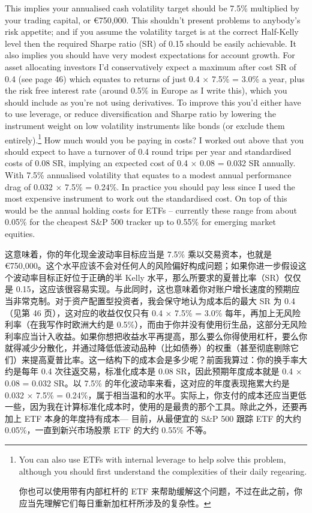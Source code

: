 \bipairgap

\begin{englishblock} This implies your annualised cash volatility target should be 7.5\% multiplied by your trading capital, or €750,000. This shouldn't present problems to anybody's risk appetite; and if you assume the volatility target is at the correct Half-Kelly level then the required Sharpe ratio (SR) of 0.15 should be easily achievable. It also implies you should have very modest expectations for account growth. For asset allocating investors I'd conservatively expect a maximum after cost SR of 0.4 (see page 46) which equates to returns of just 0.4 × 7.5\% = 3.0\% a year, plus the risk free interest rate (around 0.5\% in Europe as I write this), which you should include as you're not using derivatives. To improve this you'd either have to use leverage, or reduce diversification and Sharpe ratio by lowering the instrument weight on low volatility instruments like bonds (or exclude them entirely).\footnote{You can also use ETFs with internal leverage to help solve this problem, although you should first understand the complexities of their daily regearing. \par 你也可以使用带有内部杠杆的 ETF 来帮助缓解这个问题，不过在此之前，你应当先理解它们每日重新加杠杆所涉及的复杂性。} How much would you be paying in costs? I worked out above that you should expect to have a turnover of 0.4 round trips per year and standardised costs of 0.08 SR, implying an expected cost of 0.4 × 0.08 = 0.032 SR annually. With 7.5\% annualised volatility that equates to a modest annual performance drag of 0.032 × 7.5\% = 0.24\%. In practice you should pay less since I used the most expensive instrument to work out the standardised cost. On top of this would be the annual holding costs for ETFs -- currently these range from about 0.05\% for the cheapest S\&P 500 tracker up to 0.55\% for emerging market equities. \end{englishblock}

\begin{chineseblock}这意味着，你的年化现金波动率目标应当是 7.5\% 乘以交易资本，也就是 €750,000。这个水平应该不会对任何人的风险偏好构成问题；如果你进一步假设这个波动率目标正好位于正确的半 Kelly 水平，那么所要求的夏普比率（SR）仅仅是 0.15，这应该很容易实现。与此同时，这也意味着你对账户增长速度的预期应当非常克制。对于资产配置型投资者，我会保守地认为成本后的最大 SR 为 0.4（见第 46 页），这对应的收益仅仅只有 0.4 × 7.5\% = 3.0\% 每年，再加上无风险利率（在我写作时欧洲大约是 0.5\%），而由于你并没有使用衍生品，这部分无风险利率应当计入收益。如果你想把收益水平再提高，那么要么你得使用杠杆，要么你就得减少分散化，并通过降低低波动品种（比如债券）的权重（甚至彻底剔除它们）来提高夏普比率。这一结构下的成本会是多少呢？前面我算过：你的换手率大约是每年 0.4 次往返交易，标准化成本是 0.08 SR，因此预期年度成本就是 0.4 × 0.08 = 0.032 SR。以 7.5\% 的年化波动率来看，这对应的年度表现拖累大约是 0.032 × 7.5\% = 0.24\%，属于相当温和的水平。实际上，你支付的成本还应当更低一些，因为我在计算标准化成本时，使用的是最贵的那个工具。除此之外，还要再加上 ETF 本身的年度持有成本--- 目前，从最便宜的 S\&P 500 跟踪 ETF 的大约 0.05\%，一直到新兴市场股票 ETF 的大约 0.55\% 不等。\end{chineseblock}

